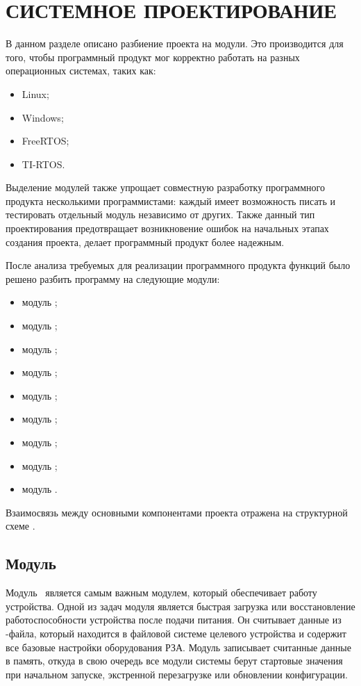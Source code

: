 \section{СИСТЕМНОЕ ПРОЕКТИРОВАНИЕ}
\label{sec:sys}

В данном разделе описано разбиение проекта на модули. Это производится для того, чтобы программный продукт мог корректно работать на разных операционных системах, таких как:
\begin{itemize}
    \item Linux;
    \item Windows;
    \item FreeRTOS;
    \item TI-RTOS.
\end{itemize}

Выделение модулей также упрощает совместную разработку программного продукта несколькими программистами: каждый имеет возможность писать и тестировать отдельный модуль независимо от других. Также данный тип проектирования предотвращает возникновение ошибок на начальных этапах создания проекта, делает программный продукт более надежным.

После анализа требуемых для реализации программного продукта функций было решено разбить программу на следующие модули:

\begin{itemize}
    \item модуль \moduleCfg;
    \item модуль \moduleXml;
    \item модуль \moduleSettingsApply;
    \item модуль \moduleRecvPackets;
    \item модуль \moduleThreads;
    \item модуль \moduleProcessPackets;
    \item модуль \moduleDataStoring;
    \item модуль \moduleOsal;
    \item модуль \moduleLog.
\end{itemize}

Взаимосвязь между основными компонентами проекта отражена на структурной схеме
\structScheme.

\subsection{Модуль \moduleCfg}

Модуль \moduleCfg\ является самым важным модулем, который обеспечивает работу устройства. Одной из задач модуля является быстрая загрузка или восстановление работоспособности устройства после подачи питания. Он считывает данные из \cid-файла, который находится в файловой системе целевого устройства и содержит все базовые настройки оборудования РЗА. Модуль записывает считанные данные в память, откуда в свою очередь все модули системы берут стартовые значения при начальном запуске, экстренной перезагрузке или обновлении конфигурации.

